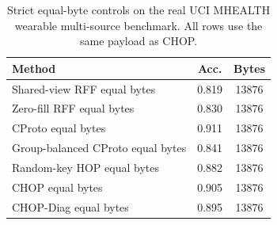 \begin{table}[t]
\centering
\caption{Strict equal-byte controls on the real UCI MHEALTH wearable multi-source benchmark. All rows use the same payload as CHOP.}
\label{tab:strict-equal-byte-mhealth}
\begin{tabular}{lcc}
\toprule
Method & Acc. & Bytes \\
\midrule
Shared-view RFF equal bytes & 0.819 & 13876 \\
Zero-fill RFF equal bytes & 0.830 & 13876 \\
CProto equal bytes & 0.911 & 13876 \\
Group-balanced CProto equal bytes & 0.841 & 13876 \\
Random-key HOP equal bytes & 0.882 & 13876 \\
CHOP equal bytes & 0.905 & 13876 \\
CHOP-Diag equal bytes & 0.895 & 13876 \\
\bottomrule
\end{tabular}
\end{table}
